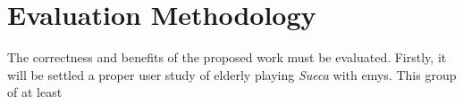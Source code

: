 \section{Evaluation Methodology} \label{evaluation}

The correctness and benefits of the proposed work must be evaluated.
Firstly, it will be settled a proper user study of elderly playing \emph{Sueca} with \gls{emys}.
This group of at least 